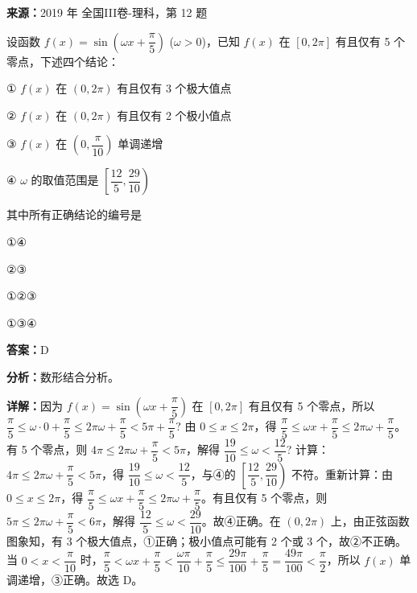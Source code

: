 \begin{question}[points=5]
\textbf{来源：}2019 年 全国III卷-理科，第 12 题\par
设函数 $f(x) = \sin\left(\omega x + \dfrac{\pi}{5}\right)$ ($\omega > 0$)，已知 $f(x)$ 在 $[0,2\pi]$ 有且仅有 5 个零点，下述四个结论：

① $f(x)$ 在 $(0,2\pi)$ 有且仅有 3 个极大值点

② $f(x)$ 在 $(0,2\pi)$ 有且仅有 2 个极小值点

③ $f(x)$ 在 $\left(0,\dfrac{\pi}{10}\right)$ 单调递增

④ $\omega$ 的取值范围是 $\left[\dfrac{12}{5},\dfrac{29}{10}\right)$

其中所有正确结论的编号是
\begin{choices}
  \item ①④
  \item ②③
  \item ①②③
  \item ①③④
\end{choices}
\begin{solution}
\textbf{答案：}D

\textbf{分析：}数形结合分析。

\textbf{详解：}因为 $f(x) = \sin\left(\omega x + \dfrac{\pi}{5}\right)$ 在 $[0,2\pi]$ 有且仅有 5 个零点，所以 $\dfrac{\pi}{5} \le \omega \cdot 0 + \dfrac{\pi}{5} \le 2\pi\omega + \dfrac{\pi}{5} < 5\pi + \dfrac{\pi}{5}$? 由 $0\le x\le 2\pi$，得 $\dfrac{\pi}{5} \le \omega x + \dfrac{\pi}{5} \le 2\pi\omega + \dfrac{\pi}{5}$。有 5 个零点，则 $4\pi \le 2\pi\omega + \dfrac{\pi}{5} < 5\pi$，解得 $\dfrac{19}{10} \le \omega < \dfrac{12}{5}$? 计算：$4\pi \le 2\pi\omega + \dfrac{\pi}{5} < 5\pi$，得 $\dfrac{19}{10} \le \omega < \dfrac{12}{5}$，与④的 $\left[\dfrac{12}{5},\dfrac{29}{10}\right)$ 不符。重新计算：由 $0\le x\le 2\pi$，得 $\dfrac{\pi}{5} \le \omega x + \dfrac{\pi}{5} \le 2\pi\omega + \dfrac{\pi}{5}$。有且仅有 5 个零点，则 $5\pi \le 2\pi\omega + \dfrac{\pi}{5} < 6\pi$，解得 $\dfrac{12}{5} \le \omega < \dfrac{29}{10}$。故④正确。在 $(0,2\pi)$ 上，由正弦函数图象知，有 3 个极大值点，①正确；极小值点可能有 2 个或 3 个，故②不正确。当 $0<x<\dfrac{\pi}{10}$ 时，$\dfrac{\pi}{5} < \omega x + \dfrac{\pi}{5} < \dfrac{\omega\pi}{10} + \dfrac{\pi}{5} \le \dfrac{29\pi}{100} + \dfrac{\pi}{5} = \dfrac{49\pi}{100} < \dfrac{\pi}{2}$，所以 $f(x)$ 单调递增，③正确。故选 D。
\end{solution}
\end{question}

